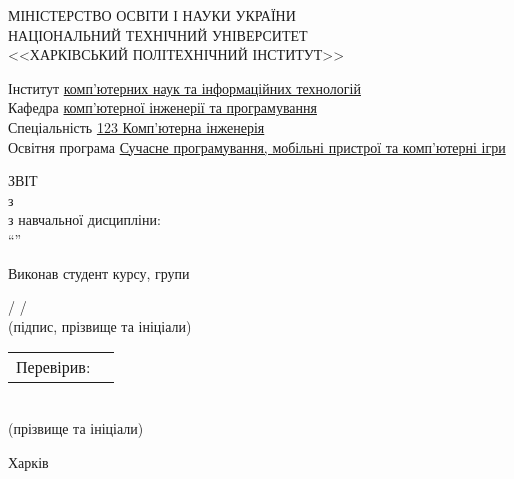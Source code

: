 \makeatletter
\begin{titlepage}
    \begin{center}
        МІНІСТЕРСТВО ОСВІТИ І НАУКИ УКРАЇНИ\\
        НАЦІОНАЛЬНИЙ ТЕХНІЧНИЙ УНІВЕРСИТЕТ\\
        <<ХАРКІВСЬКИЙ ПОЛІТЕХНІЧНИЙ ІНСТИТУТ>>\\
        \vspace*{\baselineskip}
        \raggedright
        Інститут \underline{комп'ютерних наук та інформаційних технологій}\\
        Кафедра \underline{комп’ютерної інженерії та програмування}\\
        Спеціальність \underline{123 Комп’ютерна інженерія}\\
        Освітня програма \small {} \underline{Сучасне програмування, мобільні пристрої та комп'ютерні ігри}

        \vspace*{3\baselineskip}
        \normalsize
        \centering
        \onehalfspacing

        ЗВІТ\\
        з \@title\\
        з навчальної дисципліни:\\
        ``\Subject''\\

        \vspace*{3\baselineskip}
        \raggedleft

        \begin{minipage}{0.58\textwidth}
            \raggedleft
            Виконав студент \CourseYear курсу, групи \StudGroup\\
            \vspace{0.3\baselineskip}

            \underline{\hspace{2cm}} / \@author/\\
            {\scriptsize (підпис, прізвище та ініціали)}
            
            \vspace*{0.5\baselineskip}

            \begin{minipage}{0.58\textwidth}
                \begin{tabular}{@{}ll}
                 Перевірив: & \\
                \end{tabular}
            \end{minipage}
            \vspace{0.3\baselineskip}
            
            \Mentor\\
            {\scriptsize (прізвище та ініціали)}
        \end{minipage}

        \centering
        \vfill
        Харків \the\year
    \end{center}
\end{titlepage}
\makeatother
\setcounter{page}{2}
\pagestyle{empty}
